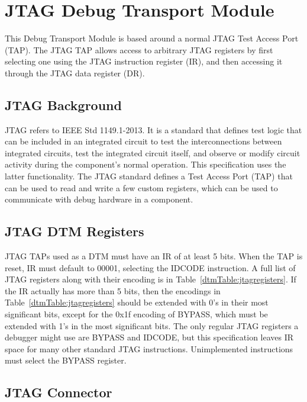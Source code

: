 \section{JTAG Debug Transport Module} \label{sec:jtagdtm}

This Debug Transport Module is based around a normal JTAG Test Access Port
(TAP).  The JTAG TAP allows access to arbitrary JTAG registers by first
selecting one using the JTAG instruction register (IR), and then accessing it
through the JTAG data register (DR).

\subsection{JTAG Background}

JTAG refers to IEEE Std 1149.1-2013. It is a standard that defines test logic
that can be included in an integrated circuit to test the interconnections
between integrated circuits, test the integrated circuit itself, and observe or
modify circuit activity during the component's normal operation.
This specification uses the latter functionality.
The JTAG standard defines a Test Access Port (TAP) that
can be used to read and write a few custom registers, which can be used to
communicate with debug hardware in a component.

\subsection{JTAG DTM Registers}

JTAG TAPs used as a DTM must have an IR of at least 5 bits.
When the TAP is reset, IR must default to
00001, selecting the IDCODE instruction. A full list of JTAG registers along
with their encoding is in Table~\ref{dtmTable:jtagregisters}.
If the IR actually has more than 5 bits, then the encodings in
Table~\ref{dtmTable:jtagregisters} should be extended with 0's in their most
significant bits, except for the 0x1f encoding of BYPASS, which must be
extended with 1's in the most significant bits.
The only regular JTAG registers a debugger might use are BYPASS and IDCODE, but this
specification leaves IR space for many other standard JTAG instructions.
Unimplemented instructions must select the BYPASS register.



\subsection{JTAG Connector}

